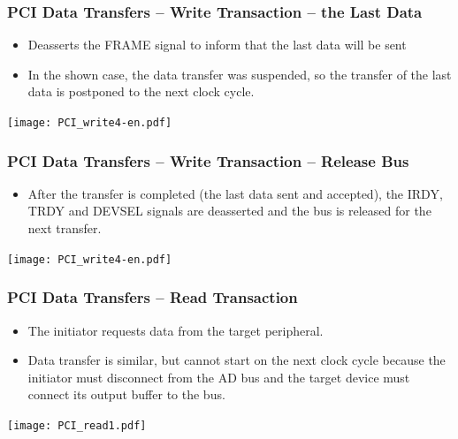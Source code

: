 \documentclass{beamer}
\begin{document}
\begin{frame}
\frametitle{PCI Data Transfers -- Write Transaction -- the Last Data}

\begin{itemize}
\item Deasserts the FRAME signal to inform that the last data will be sent
\item In the shown case, the data transfer was suspended, so the transfer of the last data is postponed to the next clock cycle.
\end{itemize}

\texttt{[image: PCI\_write4-en.pdf]}

\end{frame}

\begin{frame}
\frametitle{PCI Data Transfers -- Write Transaction -- Release Bus}

\begin{itemize}
\item After the transfer is completed (the last data sent and accepted), the IRDY, TRDY and DEVSEL signals are deasserted and the bus is released for the next transfer.
\end{itemize}

\texttt{[image: PCI\_write4-en.pdf]}

\end{frame}


\begin{frame}
\frametitle{PCI Data Transfers -- Read Transaction}

\begin{itemize}
\item The initiator requests data from the target peripheral.
\item Data transfer is similar, but cannot start on the next clock cycle because the initiator must disconnect from the AD bus and the target device must connect its output buffer to the bus.
\end{itemize}

\texttt{[image: PCI\_read1.pdf]}

\end{frame}
\end{document}
